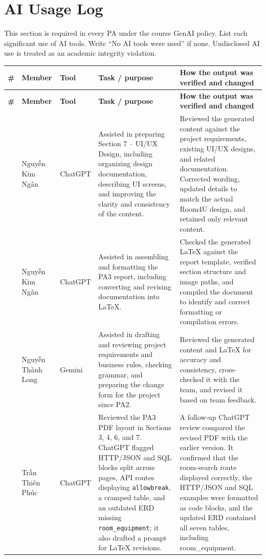 \section{AI Usage Log}

This section is required in every PA under the course GenAI policy. List each significant use of AI tools. Write ``No AI tools were used'' if none. Undisclosed AI use is treated as an academic integrity violation.

\begingroup
\small
{}
\setlength{\tabcolsep}{3pt}
\renewcommand{\arraystretch}{1.1}
\begin{longtable}{|>{\raggedright\arraybackslash}p{}|>{\raggedright\arraybackslash}p{}|>{\raggedright\arraybackslash}p{}|>{\raggedright\arraybackslash}p{}|>{\raggedright\arraybackslash}p{}|}
\hline
\textbf{\#} & \textbf{Member} & \textbf{Tool} & \textbf{Task / purpose} & \textbf{How the output was verified and changed} \\ \hline
\endfirsthead
\hline
\textbf{\#} & \textbf{Member} & \textbf{Tool} & \textbf{Task / purpose} & \textbf{How the output was verified and changed} \\ \hline
\endhead
\hline
\endfoot
\hline
\endlastfoot
1 & Nguyễn Kim Ngân & ChatGPT & Assisted in preparing Section 7 -- UI/UX Design, including organizing design documentation, describing UI screens, and improving the clarity and consistency of the content. & Reviewed the generated content against the project requirements, existing UI/UX designs, and related documentation. Corrected wording, updated details to match the actual Room4U design, and retained only relevant content. \\ \hline
2 & Nguyễn Kim Ngân & ChatGPT & Assisted in assembling and formatting the PA3 report, including converting and revising documentation into LaTeX. & Checked the generated LaTeX against the report template, verified section structure and image paths, and compiled the document to identify and correct formatting or compilation errors. \\ \hline
3 & Nguyễn Thành Long & Gemini & Assisted in drafting and reviewing project requirements and business rules, checking grammar, and preparing the change form for the project since PA2. & Reviewed the generated content and LaTeX for accuracy and consistency, cross-checked it with the team, and revised it based on team feedback. \\ \hline
4 & Trần Thiên Phúc & ChatGPT & Reviewed the PA3 PDF layout in Sections 3, 4, 6, and 7. ChatGPT flagged HTTP/JSON and SQL blocks split across pages, API routes displaying \texttt{allowbreak}, a cramped table, and an outdated ERD missing \texttt{room\_equipment}; it also drafted a prompt for LaTeX revisions. & A follow-up ChatGPT review compared the revised PDF with the earlier version. It confirmed that the room-search route displayed correctly, the HTTP/JSON and SQL examples were formatted as code blocks, and the updated ERD contained all seven tables, including room_equipment. \\ \hline

\end{longtable}
